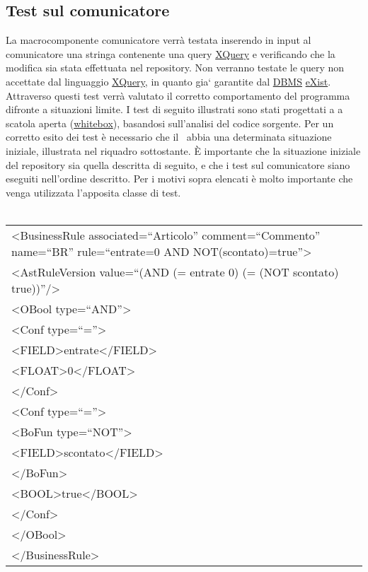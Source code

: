 \subsection{Test sul comunicatore}
La macrocomponente comunicatore verr\`a testata inserendo in input al comunicatore una stringa contenente una query \underline{XQuery} e verificando che la modifica sia stata effettuata nel repository. Non verranno testate le query non accettate dal linguaggio \underline{XQuery}, in quanto gia` garantite dal \underline{DBMS} \underline{eXist}. Attraverso questi test verr\`a valutato il corretto comportamento del programma difronte a situazioni limite. I test di seguito illustrati sono stati progettati a a scatola aperta (\underline{whitebox}), basandosi sull'analisi del codice sorgente. Per un corretto esito dei test \`e necessario che il \rp\ abbia una determinata situazione iniziale, illustrata nel riquadro sottostante. \`E importante che la situazione iniziale del repository sia quella descritta di seguito, e che i test sul comunicatore siano eseguiti nell'ordine descritto. Per i motivi sopra elencati \`e molto importante che venga utilizzata l'apposita classe di test. \\
\\

\begin{center}
\begin{tabular}{|p{11cm}|} \hline
\textless BusinessRule associated=``Articolo'' comment=``Commento'' name=``BR'' rule=``entrate=0 AND NOT(scontato)=true''\textgreater \\
\textless AstRuleVersion value=``(AND (= entrate 0) (= (NOT scontato) true))''/\textgreater \\
 \textless OBool type=``AND''\textgreater \\
 \textless Conf type=``=''\textgreater \\
 \textless FIELD\textgreater entrate\textless /FIELD\textgreater \\
 \textless FLOAT\textgreater 0\textless /FLOAT\textgreater \\
 \textless /Conf\textgreater \\
 \textless Conf type=``=''\textgreater \\
\textless BoFun type=``NOT''\textgreater \\
 \textless FIELD\textgreater scontato\textless /FIELD\textgreater \\
\textless /BoFun\textgreater \\
 \textless BOOL\textgreater true\textless /BOOL\textgreater \\
\textless /Conf\textgreater \\
\textless /OBool\textgreater \\
\textless /BusinessRule\textgreater\\ \hline
\end{tabular} \\
\end{center}

